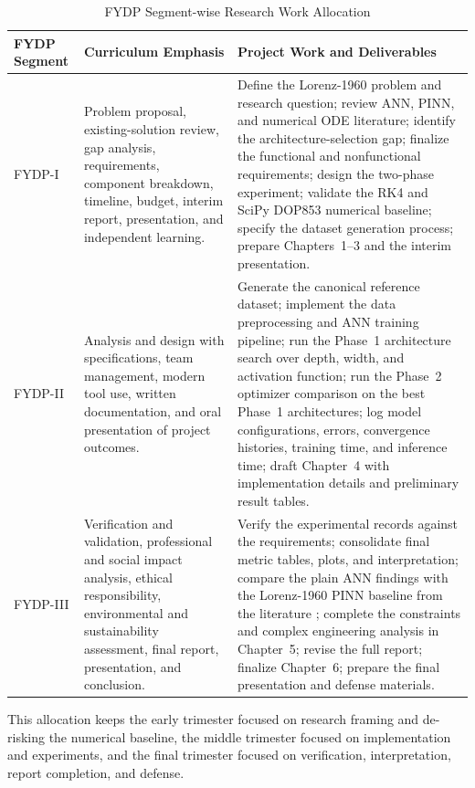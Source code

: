 \begin{table}[H]
\centering
\caption{FYDP Segment-wise Research Work Allocation}
\label{tab:fydp_segment_plan}
\small
\renewcommand{\arraystretch}{1.2}
\begin{tabularx}{\textwidth}{|p{2.2cm}|>{\raggedright\arraybackslash}X|>{\raggedright\arraybackslash}X|}
\hline
\textbf{FYDP Segment} & \textbf{Curriculum Emphasis} & \textbf{Project Work and Deliverables} \\
\hline
FYDP-I & Problem proposal, existing-solution review, gap analysis, requirements, component breakdown, timeline, budget, interim report, presentation, and independent learning. & Define the Lorenz-1960 problem and research question; review ANN, PINN, and numerical ODE literature; identify the architecture-selection gap; finalize the functional and nonfunctional requirements; design the two-phase experiment; validate the RK4 and SciPy DOP853 numerical baseline; specify the dataset generation process; prepare Chapters~1--3 and the interim presentation. \\
\hline
FYDP-II & Analysis and design with specifications, team management, modern tool use, written documentation, and oral presentation of project outcomes. & Generate the canonical reference dataset; implement the data preprocessing and ANN training pipeline; run the Phase~1 architecture search over depth, width, and activation function; run the Phase~2 optimizer comparison on the best Phase~1 architectures; log model configurations, errors, convergence histories, training time, and inference time; draft Chapter~4 with implementation details and preliminary result tables. \\
\hline
FYDP-III & Verification and validation, professional and social impact analysis, ethical responsibility, environmental and sustainability assessment, final report, presentation, and conclusion. & Verify the experimental records against the requirements; consolidate final metric tables, plots, and interpretation; compare the plain ANN findings with the Lorenz-1960 PINN baseline from the literature \cite{matthews2024pinnde}; complete the constraints and complex engineering analysis in Chapter~5; revise the full report; finalize Chapter~6; prepare the final presentation and defense materials. \\
\hline
\end{tabularx}
\end{table}

This allocation keeps the early trimester focused on research framing and de-risking the numerical baseline, the middle trimester focused on implementation and experiments, and the final trimester focused on verification, interpretation, report completion, and defense.

